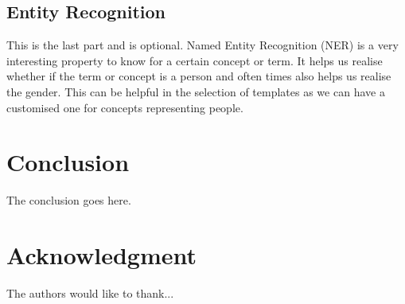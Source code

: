 \documentclass[conference]{IEEEtran}
\begin{document}
\subsection{Entity Recognition}
This is the last part and is optional. Named Entity Recognition (NER) is a very interesting property to know for a certain concept or term. It helps us realise whether if the term or concept is a person and often times also helps us realise the gender. This can be helpful in the selection of templates as we can have a customised one for concepts representing people.

\section{Conclusion}
The conclusion goes here.
\section*{Acknowledgment}


The authors would like to thank...
\end{document}
